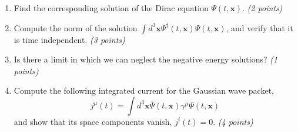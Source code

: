 \begin{enumerate}
    \item Find the corresponding solution of the Dirac equation $\Psi(t, \mathbf{x})$. \textit{(2 points)}
    \item Compute the norm of the solution $\int d^3\mathbf{x} \Psi^\dagger(t, \mathbf{x})\Psi(t, \mathbf{x})$, and verify that it is time independent. \textit{(3 points)}
    \item Is there a limit in which we can neglect the negative energy solutions? \textit{(1 points)}
    \item Compute the following integrated current for the Gaussian wave packet,
    \begin{equation}
        j^\mu(t) = \int d^3\mathbf{x} \bar{\Psi}(t, \mathbf{x})\gamma^\mu \Psi(t, \mathbf{x})
    \end{equation}
    and show that its space components vanish, $j^i(t) = 0$. \textit{(4 points)}
\end{enumerate}


